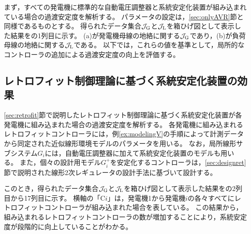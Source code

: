 \documentclass[tombow,dvipdfmx]{corona-a5-1.1}
\begin{document}

まず，すべての発電機に標準的な自動電圧調整器と系統安定化装置が組み込まれている場合の過渡安定度を解析する。
パラメータの設定は，\ref{sec:onlyAVR}節と同様であるものとする。
得られたデータ集合$\mathcal{J}_{\rm G}$と$\mathcal{J}_{\rm L}$を箱ひげ図として表示した結果をの1列目に示す。
(a)が発電機母線の地絡に関する$\mathcal{J}_{\rm G}$であり，(b)が負荷母線の地絡に関する$\mathcal{J}_{\rm L}$である。
以下では，これらの値を基準として，局所的なコントローラの追加による過渡安定度の向上を評価する。

\subsection{レトロフィット制御理論に基づく系統安定化装置の効果}

\ref{sec:retrofit}節で説明したレトロフィット制御理論に基づく系統安定化装置が各発電機に組み込まれた場合の過渡安定度を解析する。
各発電機に組み込まれるレトロフィットコントローラには，例\ref{ex:modelingV}の手順によって計測データから同定された近似線形環境モデルのパラメータを用いる。
なお，局所線形サブシステム$G_i$には，自動電圧調整器に加えて系統安定化装置のモデルも用いる。
また，個々の設計用モデル$G^+_i$を安定化するコントローラは，\ref{sec:designret}節で説明された線形2次レギュレータの設計手法に基づいて設計する。

このとき，得られたデータ集合$\mathcal{J}_{\rm G}$と$\mathcal{J}_{\rm L}$を箱ひげ図として表示した結果をの2列目から17列目に示す。
横軸の「C$i$」は，発電機1から発電機$i$の各々すべてにレトロフィットコントローラが組み込まれた場合を表している。
この結果から，組み込まれるレトロフィットコントローラの数が増加することにより，系統安定度が段階的に向上していることがわかる。
\end{document}

